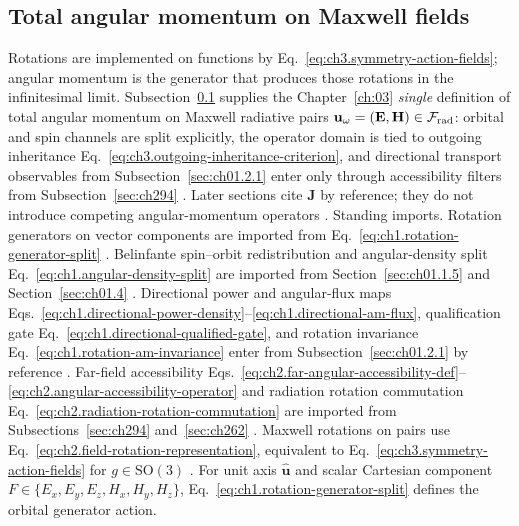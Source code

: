 \subsection{Total angular momentum on Maxwell fields}
\label{sec:ch321}
Rotations are implemented on functions by Eq.~\eqref{eq:ch3.symmetry-action-fields}; angular momentum is the
generator that produces those rotations in the infinitesimal limit. Subsection~\ref{sec:ch321} supplies the
Chapter~\ref{ch:03} \emph{single} definition of total angular momentum on Maxwell radiative pairs
\(\mathbf{u}_\omega=(\mathbf{E},\mathbf{H})\in\mathcal{F}_{\mathrm{rad}}\): orbital and spin channels are split explicitly,
the operator domain is tied to outgoing inheritance Eq.~\eqref{eq:ch3.outgoing-inheritance-criterion}, and
directional transport observables from Subsection~\ref{sec:ch01.2.1} enter only through accessibility filters
from Subsection~\ref{sec:ch294} \cite{stratton1941}. Later sections cite
\(\mathbf{J}\) by reference; they do not introduce competing angular-momentum operators
\cite{hansen1988}.
Standing imports. Rotation generators on vector components are imported from
Eq.~\eqref{eq:ch1.rotation-generator-split} \cite{stratton1941}. Belinfante spin--orbit
redistribution and angular-density split Eq.~\eqref{eq:ch1.angular-density-split} are imported from
Section~\ref{sec:ch01.1.5} and Section~\ref{sec:ch01.4} \cite{belinfante1940}. Directional
power and angular-flux maps Eqs.~\eqref{eq:ch1.directional-power-density}--\eqref{eq:ch1.directional-am-flux},
qualification gate Eq.~\eqref{eq:ch1.directional-qualified-gate}, and rotation invariance
Eq.~\eqref{eq:ch1.rotation-am-invariance} enter from Subsection~\ref{sec:ch01.2.1} by reference
\cite{stratton1941}. Far-field accessibility
Eqs.~\eqref{eq:ch2.far-angular-accessibility-def}--\eqref{eq:ch2.angular-accessibility-operator} and radiation
rotation commutation Eq.~\eqref{eq:ch2.radiation-rotation-commutation} are imported from
Subsections~\ref{sec:ch294} and~\ref{sec:ch262} \cite{stratton1941}. Maxwell
rotations on pairs use Eq.~\eqref{eq:ch2.field-rotation-representation}, equivalent to
Eq.~\eqref{eq:ch3.symmetry-action-fields} for \(g\in\mathrm{SO}(3)\) \cite{stratton1941}.
For unit axis \(\hat{\mathbf{u}}\) and scalar Cartesian component \(F\in\{E_x,E_y,E_z,H_x,H_y,H_z\}\),
Eq.~\eqref{eq:ch1.rotation-generator-split} defines the orbital generator action.
